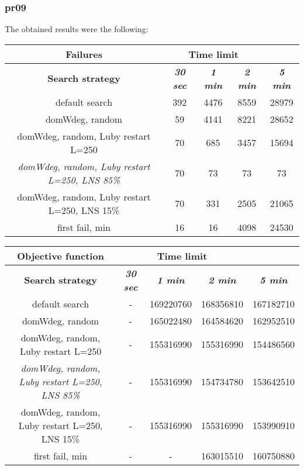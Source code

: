 \subsubsection{pr09}
The obtained results were the following:
{
\renewcommand{\arraystretch}{2}
\begin{longtable}[h]{| c | c | c | c | c |}
    \hline
    \textbf{Failures} & \multicolumn{3}{c}{Time limit} & \\
    \hline
    \textbf{Search strategy} & \textbf{\textit{30 sec}} & \textbf{\textit{1 min}} & \textbf{\textit{2 min}} & \textbf{\textit{5 min}} \\
    \hline
    \endhead
    default search                                         & 392 & 4476 & 8559 & 28979 \\
    \hline
    domWdeg, random                                        &  59 & 4141 & 8221 & 28652 \\
    \hline
    domWdeg, random, Luby restart L=250                    &  70 &  685 & 3457 & 15694 \\
    \hline
    \textit{domWdeg, random, Luby restart L=250, LNS 85\%} &  70 &   73 &   73 &    73 \\
    \hline
    domWdeg, random, Luby restart L=250, LNS 15\%          &  70 &  331 & 2505 &  21065 \\
    \hline
    first fail, min                                        &  16 &   16 & 4098 &  24530 \\
    \hline
\end{longtable}
}

{
\renewcommand{\arraystretch}{2}
\begin{longtable}[h]{| c | c | c | c | c |}
    \hline
    \textbf{Objective function} & \multicolumn{3}{c}{Time limit} & \\
    \hline
    \textbf{Search strategy} & \textbf{\textit{30 sec}} & \textbf{\textit{1 min}} & \textbf{\textit{2 min}} & \textbf{\textit{5 min}} \\
    \hline
    \endhead
    default search                                         & - & 169220760 & 168356810 & 167182710 \\
    \hline
    domWdeg, random                                        & - & 165022480 & 164584620 & 162952510 \\
    \hline
    domWdeg, random, Luby restart L=250                    & - & 155316990 & 155316990 & 154486560 \\
    \hline
    \textit{domWdeg, random, Luby restart L=250, LNS 85\%} & - & 155316990 & 154734780 & 153642510 \\
    \hline
    domWdeg, random, Luby restart L=250, LNS 15\%          & - & 155316990 & 155316990 & 153990910 \\
    \hline
    first fail, min                                        & - &         - & 163015510 & 160750880 \\
    \hline
\end{longtable}
}